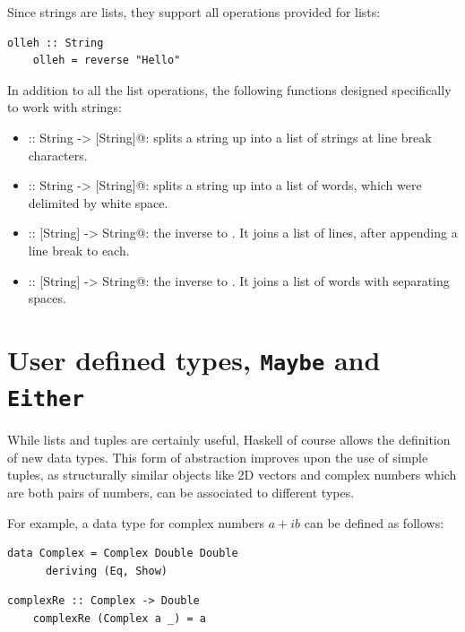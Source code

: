 \documentclass[UdineBachThesis,american,11pt,draft]{PhdThesis}
\begin{document}
  Since strings are lists, they support all operations provided for lists:

  \begin{lstlisting}[gobble=4,basicstyle=\ttfamily\small]
    olleh :: String
    olleh = reverse "Hello"
  \end{lstlisting}

  In addition to all the list operations, the following functions designed
  specifically to work with strings:

  \begin{itemize}
    \item \lstinline@lines :: String -> [String]@: splits a string up into a
    list of strings at line break characters.

    \item \lstinline@words :: String -> [String]@: splits a string up into a
    list of words, which were delimited by white space.

    \item \lstinline@unlines :: [String] -> String@: the inverse to
    \lstinline@lines@. It joins a list of lines, after appending a line break to
    each.

    \item \lstinline@unwords :: [String] -> String@: the inverse to
    \lstinline@words@. It joins a list of words with separating spaces.
  \end{itemize}

  \section{User defined types, \texttt{Maybe} and \texttt{Either}}
  \label{section:udt}

  While lists and tuples are certainly useful, Haskell of course allows the
  definition of new data types. This form of abstraction improves upon the use
  of simple tuples, as structurally similar objects like 2D vectors and complex
  numbers which are both pairs of numbers, can be associated to different types.

  For example, a data type for complex numbers $a + i b$ can be defined as
  follows:

  \begin{lstlisting}[gobble=4,basicstyle=\ttfamily\small]
    data Complex = Complex Double Double
      deriving (Eq, Show)
  \end{lstlisting}

  \begin{lstlisting}[gobble=4,basicstyle=\ttfamily\small]
    complexRe :: Complex -> Double
    complexRe (Complex a _) = a
  \end{lstlisting}
\end{document}
